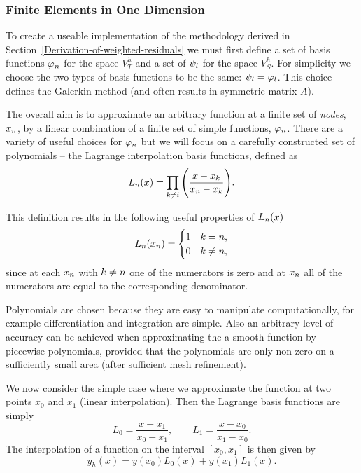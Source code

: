 \subsubsection{Finite Elements in One Dimension}
\label{sub:Actual-Finite-Elements}

To create a useable implementation of the methodology derived in Section~\ref{Derivation-of-weighted-residuals} we must first define a set of basis functions $\varphi_n$ for the space $V_{T}^{h}$ and a set of $\psi_l$ for the space $V_S^h$. For simplicity we choose the two types of basis functions to be the same: $\psi_l = \varphi_l$. This choice defines the Galerkin method (and often results in symmetric matrix $A$).\cite[pg. 215]{Zeinkiewicz1967}


The overall aim is to approximate an arbitrary function at a finite set of \emph{nodes}, $x_n$, by a linear combination of a finite set of simple functions, $\varphi_n$. There are a variety of useful choices for $\varphi_n$ but we will focus on a carefully constructed set of polynomials -- the Lagrange interpolation basis functions, defined as
\begin{equation*}
  L_n(x)=\prod_{k\neq i}\Bigg(\dfrac{x-x_{k}}{x_n-x_{k}}\Bigg).
\end{equation*}

This definition results in the following useful properties of $L_{n}(x)$
\begin{equation}
  \label{eq:35}
  L_{n}(x_{n}) =
  \begin{cases}
    1 & k = n, \\
    0 & k \neq n,
  \end{cases}
\end{equation}
since at each $x_{n}$ with $k \neq n$ one of the numerators is zero and at
$x_{n}$ all of the numerators are equal to the corresponding denominator.

Polynomials are chosen because they are easy to manipulate computationally, for example differentiation and integration are simple. Also an arbitrary level of accuracy can be achieved when approximating the a smooth function by piecewise polynomials, provided that the polynomials are only non-zero on a sufficiently small area (\ie after sufficient mesh refinement).

We now consider the simple case where we approximate the function at two points
$x_{0}$ and $x_{1}$ (linear interpolation). Then the Lagrange basis
functions are simply
\begin{equation}
  L_{0}=\dfrac{x-x_{1}}{x_{0}-x_{1}},\qquad
  L_{1}=\dfrac{x-x_{0}}{x_{1}-x_{0}}.
  \label{eq:simple_lagrange}
\end{equation}
The interpolation of a function on the interval $[x_{0},x_{1}]$ is then given by
\begin{equation*}
  y_{h}(x)=y(x_{0})L_{0}(x)+y(x_{1})L_{1}(x).
\end{equation*}

